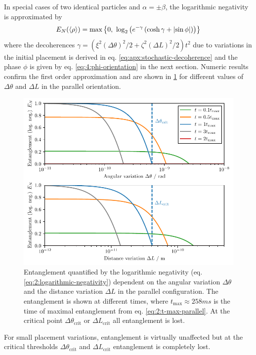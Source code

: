 In special cases of two identical particles and $\alpha=\pm\beta$, the logarithmic negativity is approximated by
\begin{equation}\label{eq:4:log-neg-analytical}
  E_N(\mean{\rho}) = \max\left\{ 0,\ \log_2\left(e^{-\gamma}\left(\cosh\gamma + \abs{\sin \phi}\right)\right) \right\}
\end{equation}
where the decoherences $\gamma = \left(\xi^2(\Delta \theta)^2/2 + \zeta^2(\Delta L)^2/2\right)t^2$ due to variations in the initial placement is derived in eq. \eqref{eq:apx:stochastic-decoherence} and the phase $\phi$ is given by eq. \eqref{eq:4:phi-orientation} in the next section.
Numeric results confirm the first order approximation and are shown in \cref{fig:4:EN-variations} for different values of $\Delta \theta$ and $\Delta L$ in the parallel orientation.
\begin{figure}[!htb]
  \centering
  \includegraphics[width=\textwidth]{./../figures/theta-variance/EN-deltaTheta-deltaL.pdf}
  \caption{Entanglement quantified by the logarithmic negativity (eq. \eqref{eq:2:logarithmic-negativity}) dependent on the angular variation $\Delta\theta$ and the distance variation $\Delta L$ in the parallel configuration. The entanglement is shown at different times, where $t_\mathrm{max} \approx 258\si{ms}$ is the time of maximal entanglement from eq. \eqref{eq:2:t-max-parallel}. At the critical point $\Delta \theta_\mathrm{crit}$ or $\Delta L_\mathrm{crit}$ all entanglement is lost.}
  \label{fig:4:EN-variations}
\end{figure}
For small placement variations, entanglement is virtually unaffected but at the critical thresholds $\Delta \theta_\mathrm{crit}$ and $\Delta L_\mathrm{crit}$ entanglement is completely lost.

